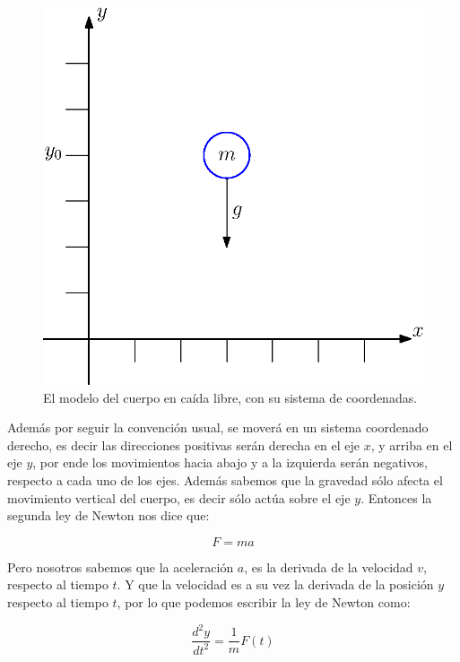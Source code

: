\begin{figure}
 \centering
 \includegraphics[]{img/01/cuerpo_caida}
 \caption[Diagrama de cuerpo libre]{ 
 El modelo del cuerpo en caída libre, con su sistema de coordenadas.
 } \label{cida:fig}
\end{figure}

Además por seguir la convención usual, se moverá en un sistema coordenado derecho, es decir las direcciones positivas serán derecha en el eje $x$, y arriba en el eje $y$, por ende los movimientos hacia abajo y a la izquierda serán negativos, respecto a cada uno de los ejes.
Además sabemos que la gravedad sólo afecta el movimiento vertical del cuerpo, es decir sólo actúa sobre el eje $y$.
Entonces la segunda ley de Newton nos dice que:

\begin{equation} 
F = m a
\end{equation} 

Pero nosotros sabemos que la aceleración $a$, es la derivada de la velocidad $v$, respecto al tiempo $t$.
Y que la velocidad es a su vez la derivada de la posición $y$ respecto al tiempo $t$, por lo que podemos escribir la ley de Newton como:

\begin{equation}
\label{ley:Newton}
 \frac{d^2y}{dt^2} = \frac{1}{m}F(t)
\end{equation}

